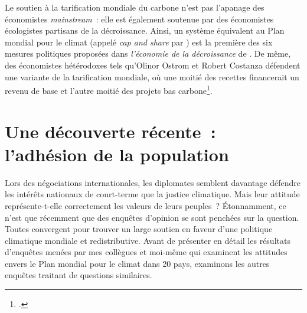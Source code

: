 \documentclass[a5paper,french,openany]{memoir}
\begin{document}
Le soutien à la tarification mondiale du carbone n'est pas l'apanage des économistes \textit{mainstream}~: elle est également soutenue par des économistes  écologistes partisans de la décroissance. Ainsi, un système équivalent au Plan mondial pour le climat (appelé \textit{cap and share} par \citealp{douthwaite_degrowth_2012}) est la première des six mesures politiques proposées dans \textit{l'économie de la décroissance} de \cite{kallis_economics_2012}. De même, des économistes hétérodoxes tels qu'Olinor Ostrom et Robert Costanza défendent une variante de la tarification mondiale, où une moitié des recettes  financerait un revenu de base et l'autre moitié des projets bas carbone\footnote{\cite{barnes_creating_2008}.}.%

\section{Une découverte récente~: l'adhésion de la population} \label{sec:soutien}

Lors des négociations internationales, les diplomates semblent davantage défendre les intérêts nationaux de court-terme que la justice climatique. 
Mais leur attitude représente-t-elle correctement les valeurs de leurs peuples~? 
Étonnamment, ce n'est que récemment que des enquêtes d'opinion se sont penchées sur la question. Toutes convergent pour trouver un large soutien en faveur d'une politique climatique mondiale et redistributive. Avant de présenter en détail les résultats d'enquêtes menées par mes collègues et moi-même qui examinent les attitudes envers le Plan mondial pour le climat dans 20 pays, %
examinons les autres enquêtes traitant de questions similaires. 
\end{document}
